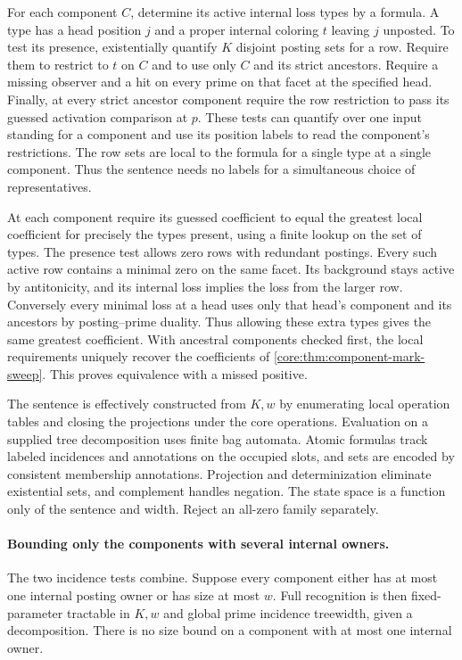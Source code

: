 For each component $C$, determine its active internal loss
types by a formula. A type has a head position $j$ and a
proper internal coloring $t$ leaving $j$ unposted. To test
its presence, existentially quantify $K$ disjoint posting
sets for a row. Require them to restrict to $t$ on $C$
and to use only $C$ and its strict ancestors. Require a
missing observer and a hit on every prime on that facet
at the specified head. Finally, at every strict ancestor
component require the row restriction to pass its guessed
activation comparison at $p$. These tests can quantify
over one input standing for a component and use its
position labels to read the component's restrictions.
The row sets are local to the formula for a single type
at a single component. Thus the sentence needs no labels
for a simultaneous choice of representatives.

At each component require its guessed coefficient to equal
the greatest local coefficient for precisely the types
present, using a finite lookup on the set of types.
The presence test allows zero rows with redundant postings.
Every such active row contains a minimal zero on the
same facet. Its background stays active by antitonicity,
and its internal loss implies the loss from the larger row.
Conversely every minimal loss at a head uses only that
head's component and its ancestors by posting--prime
duality. Thus allowing these extra types gives the same
greatest coefficient. With ancestral components checked
first, the local requirements uniquely recover the
coefficients of \cref{core:thm:component-mark-sweep}.
This proves equivalence with a missed positive.

The sentence is effectively constructed from $K,w$ by
enumerating local operation tables and closing the
projections under the core operations. Evaluation on a
supplied tree decomposition uses finite bag automata.
Atomic formulas track labeled incidences and annotations
on the occupied slots, and sets are encoded by consistent
membership annotations. Projection and determinization
eliminate existential sets, and complement handles
negation. The state space is a function only of the
sentence and width. Reject an all-zero family separately.

\paragraph{Bounding only the components with several internal owners.}
The two incidence tests combine. Suppose every component
either has at most one internal posting owner or has size
at most $w$. Full recognition is then fixed-parameter
tractable in $K,w$ and global prime incidence treewidth,
given a decomposition. There is no size bound on a
component with at most one internal owner.

